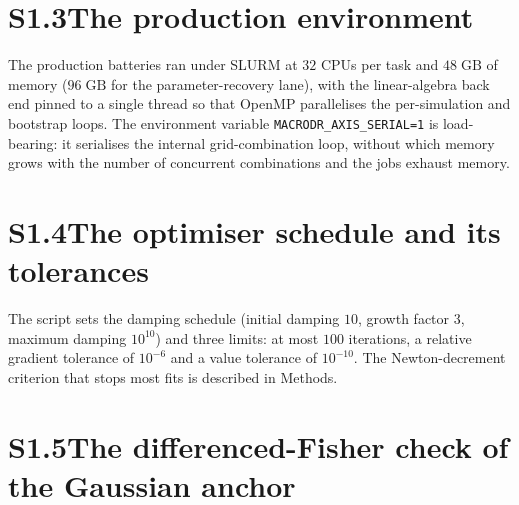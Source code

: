 \documentclass[11pt]{article}
\begin{document}
\section*{S1.3\quad The production environment}

The production batteries ran under SLURM at $32$ CPUs per task and $48\;\mathrm{GB}$
of memory ($96\;\mathrm{GB}$ for the parameter-recovery lane), with the linear-algebra
back end pinned to a single thread so that OpenMP parallelises the per-simulation and
bootstrap loops. The environment variable
\texttt{MACRODR\_\allowbreak AXIS\_\allowbreak SERIAL=1} is
load-bearing: it serialises the internal grid-combination loop, without which memory
grows with the number of concurrent combinations and the jobs exhaust memory.

\section*{S1.4\quad The optimiser schedule and its tolerances}

The script sets the damping schedule (initial damping $10$, growth
factor $3$, maximum damping $10^{10}$) and three limits: at most $100$ iterations, a
relative gradient tolerance of $10^{-6}$ and a value tolerance of $10^{-10}$.
The Newton-decrement criterion that stops most fits is described in Methods.

\section*{S1.5\quad The differenced-Fisher check of the Gaussian anchor}

\end{document}
